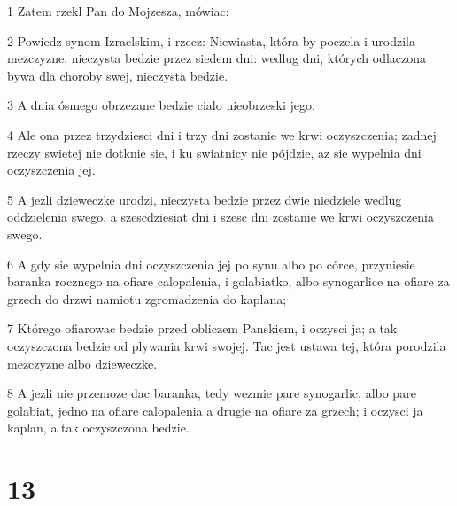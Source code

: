 \par 1 Zatem rzekl Pan do Mojzesza, mówiac:
\par 2 Powiedz synom Izraelskim, i rzecz: Niewiasta, która by poczela i urodzila mezczyzne, nieczysta bedzie przez siedem dni: wedlug dni, których odlaczona bywa dla choroby swej, nieczysta bedzie.
\par 3 A dnia ósmego obrzezane bedzie cialo nieobrzeski jego.
\par 4 Ale ona przez trzydziesci dni i trzy dni zostanie we krwi oczyszczenia; zadnej rzeczy swietej nie dotknie sie, i ku swiatnicy nie pójdzie, az sie wypelnia dni oczyszczenia jej.
\par 5 A jezli dzieweczke urodzi, nieczysta bedzie przez dwie niedziele wedlug oddzielenia swego, a szescdziesiat dni i szesc dni zostanie we krwi oczyszczenia swego.
\par 6 A gdy sie wypelnia dni oczyszczenia jej po synu albo po córce, przyniesie baranka rocznego na ofiare calopalenia, i golabiatko, albo synogarlice na ofiare za grzech do drzwi namiotu zgromadzenia do kaplana;
\par 7 Którego ofiarowac bedzie przed obliczem Panskiem, i oczysci ja; a tak oczyszczona bedzie od plywania krwi swojej. Tac jest ustawa tej, która porodzila mezczyzne albo dzieweczke.
\par 8 A jezli nie przemoze dac baranka, tedy wezmie pare synogarlic, albo pare golabiat, jedno na ofiare calopalenia a drugie na ofiare za grzech; i oczysci ja kaplan, a tak oczyszczona bedzie.

\chapter{13}

